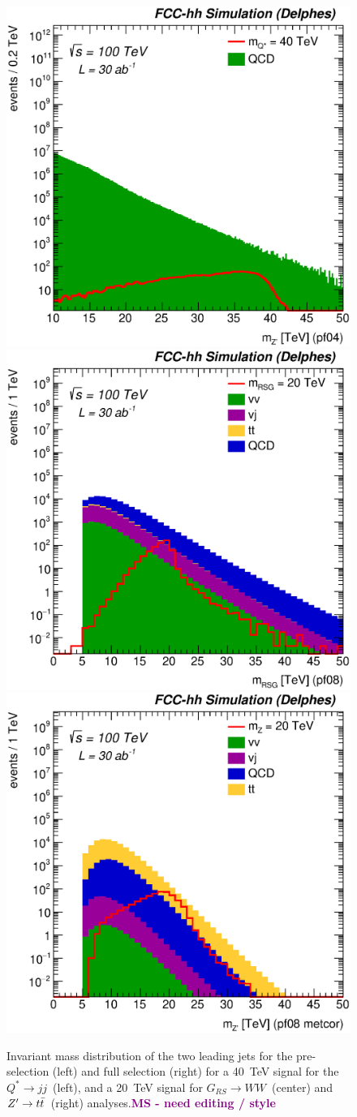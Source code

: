 \documentclass{cernrep}
\newcommand{\MS}[1] {\textbf{\textcolor{purple}{MS - #1}}}
\newcommand*{\zptt}{\ensuremath{Z^{\prime} \rightarrow \ttbar}}
\newcommand*{\qjj}{\ensuremath{Q^{*} \rightarrow jj}}
\newcommand*{\rsg}{\ensuremath{G_{RS} \rightarrow WW}}
\begin{document}
\begin{figure}[!htb]
  \centering
  \includegraphics[width=0.32\columnwidth]{Fig/Mj1j2_pf04_sel1_nostack_log.eps}
  \includegraphics[width=0.32\columnwidth]{Fig/Mj1j2_pf08_fit_sel4_nostack_log.eps}
  \includegraphics[width=0.32\columnwidth]{Fig/Mj1j2_pf08_MetCorr_fit_sel8_nostack_log.eps}
  \caption{Invariant mass distribution of the two leading jets for the pre-selection (left) and full selection (right) for a 40~TeV signal for the \qjj\ (left), and a 20~TeV signal for \rsg\ (center) and \zptt\ (right) analyses.\MS{need editing / style}}
  \label{figure:hadronicresonances:ttsel08}
\end{figure}
\end{document}
